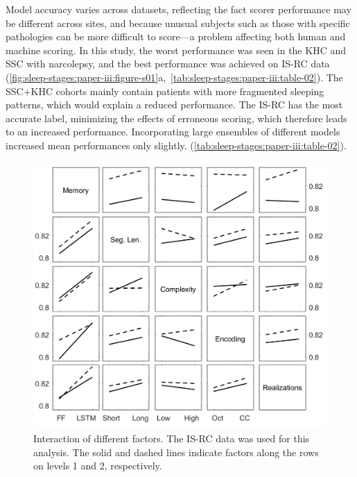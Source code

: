 Model accuracy varies across datasets, reflecting the fact scorer performance may be different across sites, and because unusual subjects such as those with specific pathologies can be more difficult to score—a problem affecting both human and machine scoring. 
In this study, the worst performance was seen in the \ac{KHC} and \ac{SSC} with narcolepsy, and the best performance was achieved on \ac{IS-RC} data (\cref{fig:sleep-stages:paper-iii:figure-s01}a,~\cref{tab:sleep-stages:paper-iii:table-02}).
The \ac{SSC}+\ac{KHC} cohorts mainly contain patients with more fragmented sleeping patterns, which would explain a reduced performance. 
The \ac{IS-RC} has the most accurate label, minimizing the effects of erroneous scoring, which therefore leads to an increased performance.
Incorporating large ensembles of different models increased mean performances only slightly. (\cref{tab:sleep-stages:paper-iii:table-02}).

\begin{figure}[tb]
    \centering
    \includegraphics[width=\textwidth]{figures/paper-iii/SuppFigure_2.png}
    \caption[Factor interactions]{Interaction of different factors. The \ac{IS-RC} data was used for this analysis. The solid and dashed lines indicate factors along the rows on levels 1 and 2, respectively.}
    \label{fig:sleep-stages:paper-iii:figure-s02}
\end{figure}

